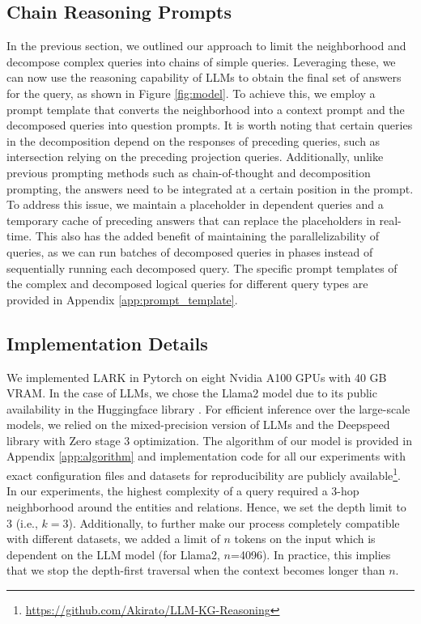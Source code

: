 \documentclass{article} %
\newcommand{\model}{LARK}
\newcommand{\modelurl}{https://github.com/Akirato/LLM-KG-Reasoning}
\begin{document}
\subsection{Chain Reasoning Prompts}
\label{sec:prompt_answer}
In the previous section, we outlined our approach to limit the neighborhood and decompose complex queries into chains of simple queries. Leveraging these, we can now use the reasoning capability of LLMs to obtain the final set of answers for the query, as shown in Figure \ref{fig:model}. To achieve this, we employ a prompt template that converts the neighborhood into a context prompt and the decomposed queries into question prompts. It is worth noting that certain queries in the decomposition depend on the responses of preceding queries, such as intersection relying on the preceding projection queries. Additionally, unlike previous prompting methods such as chain-of-thought \citep{wei2022chain} and decomposition \citep{khot2023decomposed} prompting, the answers need to be integrated at a certain position in the prompt. To address this issue, we maintain a placeholder in dependent queries and a temporary cache of preceding answers that can replace the placeholders in real-time. This also has the added benefit of maintaining the parallelizability of queries, as we can run batches of decomposed queries in phases instead of sequentially running each decomposed query. The specific prompt templates of the complex and decomposed logical queries for different query types are provided in Appendix \ref{app:prompt_template}. 

\subsection{Implementation Details}
\label{sec:implementation}
We implemented {\model} in Pytorch \citep{pytorch} on eight Nvidia A100 GPUs with 40 GB VRAM. In the case of LLMs, we chose the Llama2 model \citep{touvron2023llama} due to its public availability in the Huggingface library \citep{wolf2020transformers} . For efficient inference over the large-scale models, we relied on the mixed-precision version of LLMs and the Deepspeed library \citep{rasley2020deepspeed} with Zero stage 3 optimization. The algorithm of our model is provided in Appendix \ref{app:algorithm} and implementation code for all our experiments with exact configuration files and datasets for reproducibility are publicly available\footnote{ \url{\modelurl}}. In our experiments, the highest complexity of a query required a 3-hop neighborhood around the entities and relations. Hence, we set the depth limit to 3 (i.e., $k=3$). Additionally, to further make our process completely compatible with different datasets, we added a limit of $n$ tokens on the input which is dependent on the LLM model (for Llama2, $n$=4096). In practice, this implies that  we stop the depth-first traversal when the context becomes longer than $n$.
\end{document}
